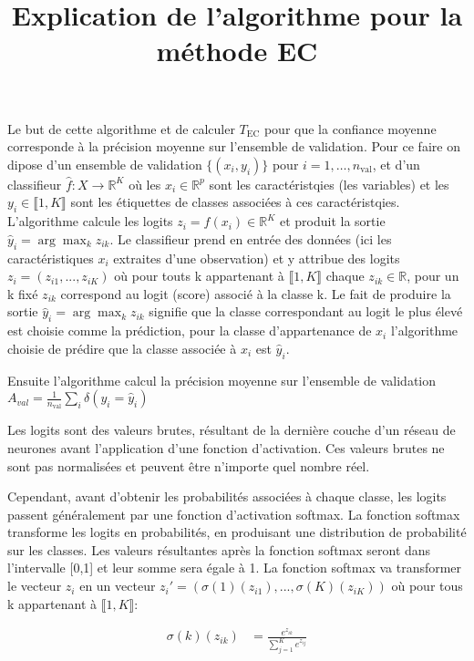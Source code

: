 \documentclass{article}
\title{Explication de l'algorithme pour la méthode EC}
\begin{document}
\maketitle

Le but de cette algorithme et de calculer $T_{\text{EC}}$ pour que la confiance moyenne corresponde à la précision moyenne sur l’ensemble de validation. Pour ce faire on dipose d'un ensemble de validation $\{(x_i, y_i)\}$ pour $i = 1, \ldots, n_{\text{val}}$, et d'un classifieur $\hat{f} : X \rightarrow \mathbb{R}^K$ où les \(x_i \in \mathbb{R}^p\) sont les caractéristqies (les variables) et les \(y_i \in\llbracket 1, K \rrbracket\) sont les étiquettes de classes associées à ces caractéristqies. L'algorithme calcule les logits $z_i = f(x_i) \in \mathbb{R}^K$ et produit la sortie $\hat{y}_i = \arg \max_k z_{ik}$.
Le classifieur prend en entrée des données (ici les caractéristiques $x_i$ extraites d'une observation) et y attribue des logits  $z_i=(z_{i1},...,z_{iK})$ où pour touts k appartenant à \(\llbracket 1, K \rrbracket\) chaque \(z_{ik} \in \mathbb{R}\), pour un k fixé $z_{ik}$ correspond au logit (score) associé à la classe k. Le fait de produire la sortie $\hat{y}_i = \arg \max_k z_{ik}$ signifie que la classe correspondant au logit le plus élevé est choisie comme la prédiction, pour la classe d'appartenance de $x_i$ l'algorithme choisie de prédire que la classe associée à $x_i$ est $\hat{y}_i$.

Ensuite l'algorithme calcul la précision moyenne sur l'ensemble de validation $A_{val} = \frac{1}{n_{\text{val}}} \sum_{i} \delta(y_i = \hat{y}_i)$ 

Les logits sont des valeurs brutes, résultant de la dernière couche d'un réseau de neurones avant l'application d'une fonction d'activation. Ces valeurs brutes ne sont pas normalisées et peuvent être n'importe quel nombre réel.

Cependant, avant d'obtenir les probabilités associées à chaque classe, les logits passent généralement par une fonction d'activation softmax. La fonction softmax transforme les logits en probabilités, en produisant une distribution de probabilité sur les classes. Les valeurs résultantes après la fonction softmax seront dans l'intervalle [0,1] et leur somme sera égale à 1. La fonction softmax va transformer le vecteur $z_i$ en un vecteur $z_i'=(\sigma(1)(z_{i1}),...,\sigma(K)(z_{iK}))$ où pour tous k appartenant à \(\llbracket 1, K \rrbracket\):

\begin{align*}
\sigma(k)(z_{ik}) &= \frac{e^{z_{ik}}}{\sum_{j=1}^{K} e^{z_{ij}}} \\
\end{align*}
\end{document}
